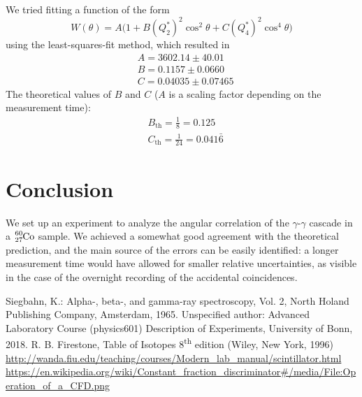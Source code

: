 \documentclass[twocolumn]{article}
\begin{document}
We tried fitting a function of the form
\begin{equation}
W(\theta) = A \big(1 + B (Q^{*}_2)^2 \cos^2 \theta + C (Q^{*}_4)^2 \cos^4 \theta \big) \nonumber
\end{equation} 
using the least-squares-fit method, which resulted in
\begin{align*}
&A = 3602.14 \pm 40.01\\
&B = 0.1157  \pm 0.0660\\
&C = 0.04035 \pm 0.07465
\end{align*}
The theoretical values of $B$ and $C$ ($A$ is a scaling factor depending on the measurement time):
\begin{align*}
&B_{\text{th}} = \frac{1}{8} = 0.125\\
&C_{\text{th}} = \frac{1}{24} = 0.041\bar{6}
\end{align*}
\section{Conclusion}
We set up an experiment to analyze the angular correlation of the $\gamma$-$\gamma$ cascade in a $\ce{_27^{60}Co}$ sample. We achieved a somewhat good agreement with the theoretical prediction, and the main source of the errors can be easily identified: a longer measurement time would have allowed for smaller relative uncertainties, as visible in the case of the overnight recording of the accidental coincidences.

\begin{thebibliography}{9}
Siegbahn, K.: Alpha-, beta-, and gamma-ray spectroscopy, Vol. 2, North Holand Publishing Company, Amsterdam, 1965.
Unspecified author: Advanced Laboratory Course (physics601) Description of Experiments, University of Bonn, 2018.
R. B. Firestone, Table of Isotopes $8$\textsuperscript{th} edition
 (Wiley, New York, 1996)
 \url{http://wanda.fiu.edu/teaching/courses/Modern_lab_manual/scintillator.html}
\url{https://en.wikipedia.org/wiki/Constant_fraction_discriminator#/media/File:Operation_of_a_CFD.png}
\end{thebibliography}
\end{document}
